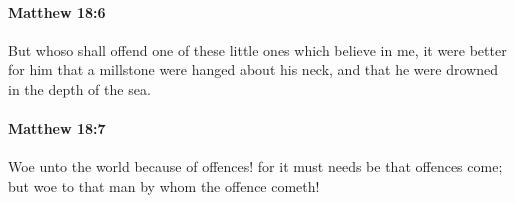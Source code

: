 		\paragraph{Matthew 18:6} %
			\label{MATTHEW-18-6}

			But whoso shall offend one of these little ones which believe in me, it were better for him that a millstone were hanged about his neck, and that he were drowned in the depth of the sea.

			\begin{framed}
			\scriptsize
				\begin{compactdesc}
					\item[SBLG] 
				\end{compactdesc}
			\end{framed}

		\paragraph{Matthew 18:7} %
			\label{MATTHEW-18-7}

			Woe unto the world because of offences! for it must needs be that offences come; but woe to that man by whom the offence cometh!

